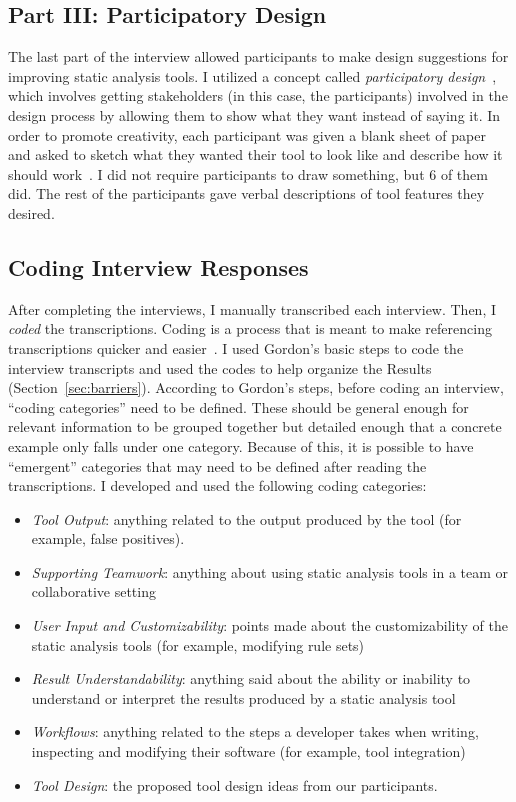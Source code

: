 \subsection{Part III: Participatory Design}
\label{subsec:part3}

The last part of the interview allowed participants to make
design suggestions for improving static analysis tools. I utilized a concept
called \textit{participatory design}~\cite{Spinuzzi:2005:Participatory}, which involves
getting stakeholders (in this case, the participants) involved in the design
process by allowing them to show what they want instead of saying it. In order
to promote creativity, each participant was given a blank sheet of paper and
asked to sketch what they wanted their tool to look like and describe how it should
work~\cite{Johnson:2012:PreFFSAT}. I did not require participants to draw
something, but 6 of them did. The rest of the participants gave verbal
descriptions of tool features they desired.


\subsection{Coding Interview Responses}
\label{subsec:coding}
After completing the interviews, I manually transcribed each interview.
Then, I \textit{coded} the transcriptions. Coding
is a process that is meant to make referencing transcriptions quicker and
easier~\cite{Gordon:1998:Coding}. I used Gordon's basic steps to code the 
interview transcripts and used the codes to help organize the Results
(Section~\ref{sec:barriers}). According to Gordon's steps, before coding an interview, ``coding
categories'' need to be defined. These should be general enough for relevant
information to be grouped together but detailed enough that a concrete example
only falls under one category. Because of this, it is possible to have
``emergent'' categories that may need to be defined after reading the
transcriptions. I developed and used the following coding categories:

\begin{itemize}
    \item \emph{Tool Output}: anything related to the output produced by
the tool (for example, false positives).
    \item \emph{Supporting Teamwork}: anything about using static analysis tools in a team or collaborative setting
    \item \emph{User Input and Customizability}: points made about the customizability of the static analysis tools (for example, modifying rule sets)
    \item \emph{Result Understandability}:  anything said about the ability or inability to understand or interpret the results produced by a static analysis tool
    \item \emph{Workflows}: anything related to the steps a developer takes when writing, inspecting and modifying their software (for example, tool integration)
    \item \emph{Tool Design}: the proposed tool design ideas from our participants.
\end{itemize}

